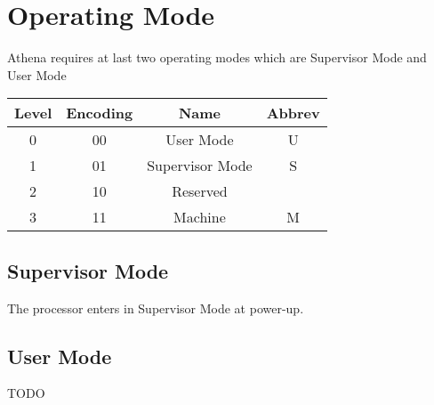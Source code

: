 \section{Operating Mode}

Athena requires at last two operating modes which are Supervisor Mode and User Mode

\begin{tabular}{ | c | c | c | c | }
    \hline
    Level & Encoding & Name & Abbrev \\ \hline
    0 & 00 & User Mode & U \\
    1 & 01 & Supervisor Mode & S \\
    2 & 10 & Reserved & \\
    3 & 11 & Machine & M \\
    \hline
\end{tabular}

\subsection{Supervisor Mode}

The processor enters in Supervisor Mode at power-up.

\subsection{User Mode}

TODO
